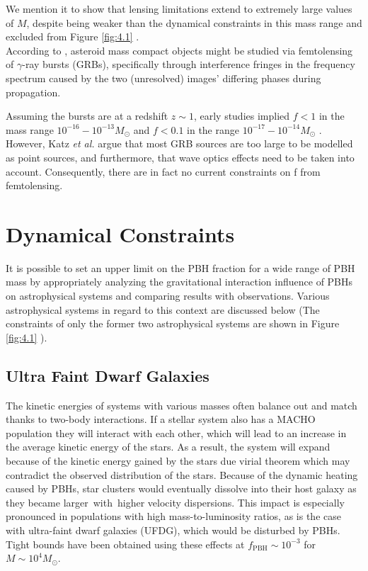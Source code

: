We mention it to show that lensing limitations extend to extremely large values of $M$, despite being weaker than the dynamical constraints in this mass range and excluded from Figure \ref{fig:4.1} .\\

According to \cite{1992ApJ...386L...5G}, asteroid mass compact objects might be studied via femtolensing of $\gamma$-ray bursts (GRBs), specifically through interference fringes in the frequency spectrum caused by the two (unresolved) images' differing phases during propagation.

Assuming the bursts are at a redshift $z \sim 1$, early studies implied $f < 1$ in the mass range
$10^{-16} - 10^{-13} M_{\odot}$ \cite{Marani:1998sh}\cite{Nakamura:1997sm} and $f < 0.1$ in the range $10^{-17} - 10^{-14} M_{\odot}$ \cite{Barnacka_2012}. However, Katz \emph{et al.} \cite{Katz:2018zrn} argue that most GRB sources are too large to be modelled as point sources, and furthermore, that wave optics effects \cite{Ulmer:1994ij} need to be taken into account. Consequently, there are in fact no current constraints on f from femtolensing.




\section{Dynamical Constraints}
It is possible to set an upper limit on the PBH fraction for a wide range of PBH mass by appropriately analyzing the gravitational interaction influence of PBHs on astrophysical systems and comparing results with observations. Various astrophysical systems in regard to this context are discussed below (The constraints of only the former two astrophysical systems are shown in Figure \ref{fig:4.1} ).
\subsection{Ultra Faint Dwarf Galaxies}
The kinetic energies of systems with various masses often balance out and match thanks to two-body interactions. If a stellar system also has a MACHO population they  will interact with each other, which will lead to an increase in the average kinetic energy of the stars. As a result,  the system will expand because of the kinetic energy gained by the stars due virial theorem which may contradict the observed distribution of the stars. Because of the dynamic heating caused by PBHs, star clusters would eventually dissolve into their host galaxy as they became larger with higher velocity dispersions. This impact is especially pronounced in populations with high mass-to-luminosity ratios, as is the case with ultra-faint dwarf galaxies (UFDG), which would be disturbed by PBHs. Tight bounds have been obtained using these effects at $f_{\mathrm{PBH}} \sim 10^{-3}$ for $ M \sim 10^{4} M_{\odot}$\cite{Brandt:2016aco}. \\
